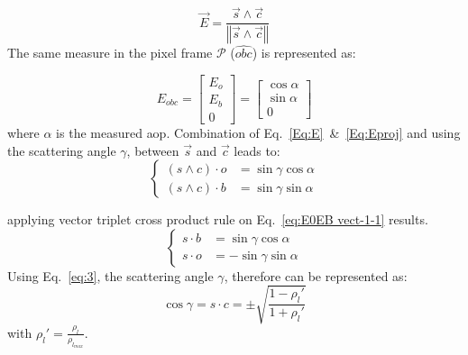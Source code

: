 \begin{equation}
\vec{E}=\frac{\vec{s}\wedge \vec{c}}{\left\Vert \vec{s}\wedge
    \vec{c}\right\Vert }
\label{Eq:E}
\end{equation}
The same measure in the pixel frame $\mathcal{P}$ ($\widehat{obc}$) is represented as:

\begin{equation}
E_{obc}=\left[\begin{array}{l}
E_{o}\\
E_{b}\\
0
\end{array}\right]=\left[\begin{array}{l}
\cos\alpha\\
\sin\alpha\\
0
\end{array}\right]
\label{Eq:Eproj}
\end{equation}
\noindent where $\alpha$ is the measured \gls{aop}.
Combination of Eq.~\ref{Eq:E}~\&~\ref{Eq:Eproj} and using the
scattering angle $\gamma$, between $\vec{s}$ and $\vec{c}$ leads to:
\begin{equation}
  \begin{cases}
(s\wedge c)\cdot o & =\sin\gamma\cos\alpha\\
(s\wedge c)\cdot b & =\sin\gamma\sin\alpha
\end{cases}
\label{eq:E0EB vect-1-1}
\end{equation}

\noindent applying vector triplet cross product rule on Eq.~\ref{eq:E0EB
  vect-1-1} results.
\begin{equation}
\begin{cases}
s\cdot b & =\sin\gamma\cos\alpha\\
s\cdot o & =-\sin\gamma\sin\alpha
\end{cases}
\label{eq:scal-b-o}
\end{equation}
Using Eq.~\ref{eq:3}, the scattering angle $\gamma$, therefore can be
represented as:
\begin{equation}
\cos\gamma=s\cdot c=\pm\sqrt{\frac{1-\rho_{l}'}{1+\rho_{l}'}}
\label{Eq:cosg}
\end{equation}
\noindent with $\rho_{l}'=\frac{\rho_{l}}{\rho_{l_{max}}}.$ \\
\vspace{0.4mm}

